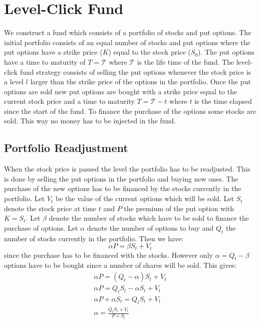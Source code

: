 \documentclass[11pt]{article}
\begin{document}
\section{Level-Click Fund}
We construct a fund which consists of a portfolio of stocks and put options.
The initial portfolio consists of an equal number of stocks and put options
where the put options have a strike price ($K$) equal to the stock price
($S_0$). The put options have a time to maturity of $T = \mathcal{T}$ where
$\mathcal{T}$ is the life time of the fund. The level-click fund strategy
consists of selling the put options whenever the stock price is a level $l$
larger than the strike price of the options in the portfolio. Once the put
options are sold new put options are bought with a strike price equal to the
current stock price and a time to maturity $T = \mathcal{T} - t$ where $t$ is
the time elapsed since the start of the fund. To finance the purchase of the
options some stocks are sold. This way no money has to be injected in the
fund.

\subsection{Portfolio Readjustment}
When the stock price is passed the level the portfolio has to be readjusted.
This is done by selling the put options in the portfolio and buying new ones.
The purchase of the new options has to be financed by the stocks currently in
the portfolio. Let $V_t$ be the value of the current options which will be sold.
Let $S_t$ denote the stock price at time $t$ and $P$ the premium of the put
option with $K = S_t$. Let $\beta$ denote the number of stocks which have to
be sold to finance the purchase of options. Let $\alpha$ denote the number of
options to buy and $Q_t$ the number of stocks currently in the portfolio.
Then we have:
\begin{equation}
\alpha P = \beta S_t + V_t
\end{equation}
since the purchase has to be financed with the stocks. However only $\alpha =
Q_t - \beta$ options have to be bought since a number of shares will be sold.
This gives:
\begin{align}
\alpha P = (Q_t - \alpha)S_t + V_t\\
\alpha P = Q_tS_t-\alpha S_t + V_t\\
\alpha P + \alpha S_t = Q_t S_t + V_t\\
\alpha = \frac{Q_t S_t + V_t}{P + S_t}
\end{align}
\end{document}
